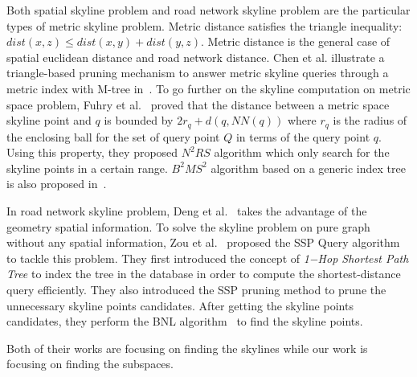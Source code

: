 Both spatial skyline problem and road network skyline problem are the particular types of metric skyline problem. Metric distance satisfies the triangle inequality: $dist(x, z) \leq dist(x, y) + dist(y, z)$. Metric distance is the general case of spatial euclidean distance and road network distance. Chen et al. illustrate a triangle-based pruning mechanism to answer metric skyline queries through a metric index with M-tree in~\cite{chen2008dynamic}. To go further on the skyline computation on metric space problem, Fuhry et al.~\cite{fuhry2009efficient} proved that the distance between a metric space skyline point and $q$ is bounded by $2r_q + d(q, NN(q))$ where $r_q$ is the radius of the enclosing ball for the set of query point $Q$ in terms of the query point $q$. Using this property, they proposed $N^2RS$ algorithm which only search for the skyline points in a certain range. $B^2MS^2$ algorithm based on a generic index tree is also proposed in~\cite{fuhry2009efficient}.

In road network skyline problem, Deng et al.~\cite{deng2007multi} takes the advantage of the geometry spatial information. To solve the skyline problem on pure graph without any spatial information, Zou et al.~\cite{zou2010dynamic} proposed the SSP Query algorithm to tackle this problem. They first introduced the concept of \emph{1−Hop Shortest Path Tree} to index the tree in the database in order to compute the shortest-distance query efficiently. They also introduced the SSP pruning method to prune the unnecessary skyline points candidates. After getting the skyline points candidates, they perform the BNL algorithm~\cite{borzsony2001skyline} to find the skyline points.

Both of their works are focusing on finding the skylines while our work is focusing on finding the subspaces.


